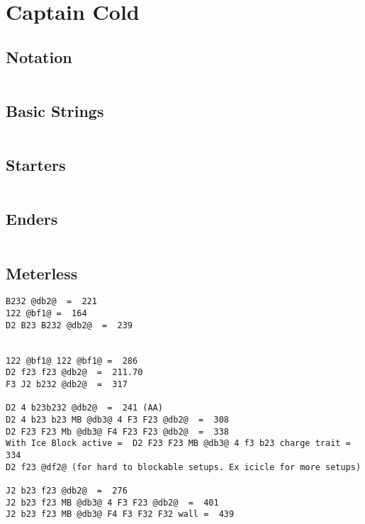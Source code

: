 \documentclass[main.tex]{subfiles}
\begin{document}
\chapter{Captain Cold}

\section{Notation}
\begin{lstlisting}[language=FG]
\end{lstlisting}


\section{Basic Strings}

\begin{lstlisting}[language=FG]
\end{lstlisting}

\section{Starters}
\begin{lstlisting}[language=FG]

\end{lstlisting}

\section{Enders}

\begin{lstlisting}[language=FG]
\end{lstlisting}

\section{Meterless}


\begin{lstlisting}[language=FG]
B232 @db2@  =  221
122 @bf1@ =  164
D2 B23 B232 @db2@  =  239


122 @bf1@ 122 @bf1@ =  286
D2 f23 f23 @db2@  =  211.70
F3 J2 b232 @db2@  =  317

D2 4 b23b232 @db2@  =  241 (AA)
D2 4 b23 b23 MB @db3@ 4 F3 F23 @db2@  =  308
D2 F23 F23 Mb @db3@ F4 F23 F23 @db2@  =  338
With Ice Block active =  D2 F23 F23 MB @db3@ 4 f3 b23 charge trait =  334
D2 f23 @df2@ (for hard to blockable setups. Ex icicle for more setups)

J2 b23 f23 @db2@  =  276
J2 b23 f23 MB @db3@ 4 F3 F23 @db2@  =  401
J2 b23 f23 MB @db3@ F4 F3 F32 F32 wall =  439
\end{lstlisting}
\end{document}
